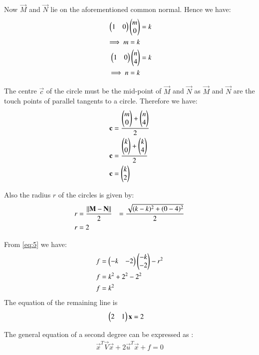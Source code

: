 \documentclass[journal,12pt,twocolumn]{IEEEtran}
\begin{document}
Now $\vec{M}$ and $\vec{N}$ lie on the aforementioned common normal. Hence we have:
\begin{align}
\begin{pmatrix}1 & 0\end{pmatrix}\begin{pmatrix}m \\ 0\end{pmatrix} &= k\\
\implies m= k\\
\begin{pmatrix}1 & 0\end{pmatrix}\begin{pmatrix}n \\ 4\end{pmatrix} &= k\\
\implies n= k
\end{align}

The centre $\vec{c}$ of the circle must be the mid-point of $\vec{M}$ and $\vec{N}$ as $\vec{M}$ and $\vec{N}$ are the touch points of parallel tangents to a circle. Therefore we have:
\begin{align}
\mathbf{c} &= \dfrac{\begin{pmatrix}m \\ 0\end{pmatrix} + \begin{pmatrix}n \\ 4\end{pmatrix}}{2}\\
\mathbf{c} &= \dfrac{\begin{pmatrix}k \\ 0\end{pmatrix} + \begin{pmatrix}k \\ 4\end{pmatrix}}{2}\\
\mathbf{c} &= \begin{pmatrix}k \\ 2\end{pmatrix}
\end{align}

Also the radius $r$ of the circles is given by:
\begin{align}
r &= \dfrac{\lVert\mathbf{M}-\mathbf{N}\rVert}{2}
&= \dfrac{\sqrt{(k-k)^{2}+(0-4)^{2}}}{2}\\
r &= 2
\end{align}

From \eqref{eq:5} we have:
\begin{align}
f &=\begin{pmatrix}-k&-2\end{pmatrix}\begin{pmatrix}-k\\-2\end{pmatrix}-r^2\\
f &= k^2 + 2^2 -2^2\\
f &= k^2\label{eq:6}
\end{align}
The equation of the remaining line is
\begin{align}
\begin{pmatrix}2 & 1\end{pmatrix}\mathbf{x}& = 2 \label{eq:7}
\end{align}

The general equation of a second degree can be expressed as :
\begin{align}
\vec{x}^T\vec{V}\vec{x}+2\vec{u}^T\vec{x}+f=0\label{eq:8}
\end{align}
\end{document}

